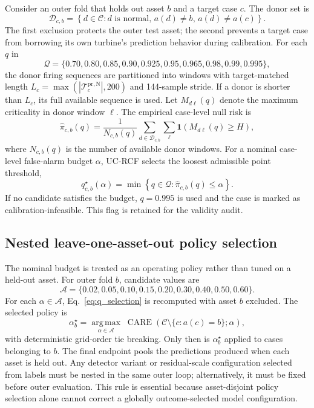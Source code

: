 Consider an outer fold that holds out asset $b$ and a target case $c$. The donor
set is
\begin{equation}
\mathcal{D}_{c,b}=
\left\{d\in\mathcal{C}: d\text{ is normal},\,
a(d)\neq b,\,a(d)\neq a(c)\right\}.
\label{eq:donor_set}
\end{equation}
The first exclusion protects the outer test asset; the second prevents a target
case from borrowing its own turbine's prediction behavior during calibration.
For each $q$ in
\begin{equation*}
\mathcal{Q}=\{0.70,0.80,0.85,0.90,0.925,0.95,0.965,0.98,0.99,0.995\},
\end{equation*}
the donor firing sequences are partitioned into windows with target-matched
length $L_c=\max(|\mathcal{T}^{\mathrm{pr,N}}_c|,200)$ and 144-sample stride.
If a donor is shorter than $L_c$, its full available sequence is used. Let
$M_{d\ell}(q)$ denote the maximum criticality in donor window $\ell$. The
empirical case-level null risk is
\begin{equation}
\widehat{\pi}_{c,b}(q)=
\frac{1}{N_{c,b}(q)}
\sum_{d\in\mathcal{D}_{c,b}}\sum_{\ell}
\mathbf{1}\!\left(M_{d\ell}(q)\geq H\right),
\label{eq:null_false_alarm}
\end{equation}
where $N_{c,b}(q)$ is the number of available donor windows. For a nominal
case-level false-alarm budget $\alpha$, UC-RCF selects the loosest admissible
point threshold,
\begin{equation}
q^{\star}_{c,b}(\alpha)=
\min\left\{q\in\mathcal{Q}:\widehat{\pi}_{c,b}(q)\leq\alpha\right\}.
\label{eq:q_selection}
\end{equation}
If no candidate satisfies the budget, $q=0.995$ is used and the case is marked
as calibration-infeasible. This flag is retained for the validity audit.

\subsection{Nested leave-one-asset-out policy selection}

The nominal budget is treated as an operating policy rather than tuned on a
held-out asset. For outer fold $b$, candidate values are
\begin{equation*}
\mathcal{A}=\{0.02,0.05,0.10,0.15,0.20,0.30,0.40,0.50,0.60\}.
\end{equation*}
For each $\alpha\in\mathcal{A}$, Eq.~\eqref{eq:q_selection} is recomputed with
asset $b$ excluded. The selected policy is
\begin{equation}
\alpha_b^{\star}=
\underset{\alpha\in\mathcal{A}}{\operatorname*{arg\,max}}
\;\operatorname{CARE}
\left(\mathcal{C}\setminus\{c:a(c)=b\};\alpha\right),
\label{eq:outer_policy}
\end{equation}
with deterministic grid-order tie breaking. Only then is
$\alpha_b^{\star}$ applied to cases belonging to $b$. The final endpoint pools
the predictions produced when each asset is held out. Any detector variant or
residual-scale configuration selected from labels must be nested in the same
outer loop; alternatively, it must be fixed before outer evaluation. This rule
is essential because asset-disjoint policy selection alone cannot correct a
globally outcome-selected model configuration.

